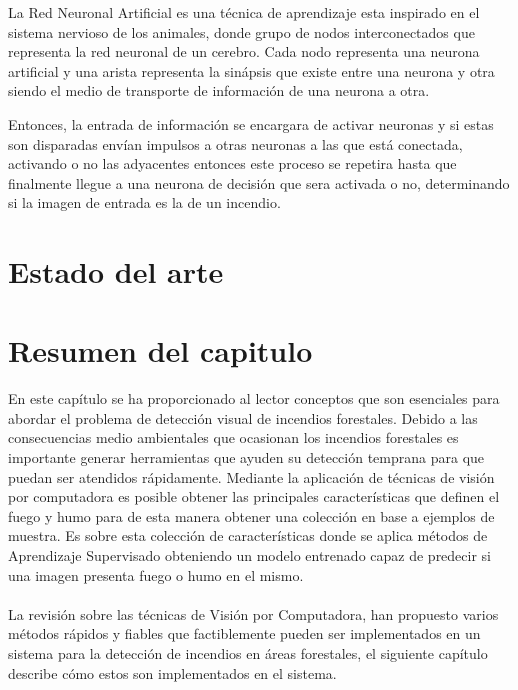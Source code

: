 La Red Neuronal Artificial es una técnica de aprendizaje esta inspirado en el sistema nervioso de los animales, donde grupo de nodos interconectados que representa la red neuronal de un cerebro. Cada nodo representa una neurona artificial y una arista representa la sinápsis que existe entre una neurona y otra siendo el medio de transporte de información de una neurona a otra.

Entonces, la entrada de información se encargara de activar neuronas y si estas son disparadas envían impulsos a otras neuronas a las que está conectada, activando o no las adyacentes entonces este proceso se repetira hasta que finalmente llegue a una neurona de decisión que sera activada o no, determinando si la imagen de entrada es la de un incendio.

\section{Estado del arte}



\section{Resumen del capitulo}

\paragraph{}
En este capítulo se ha proporcionado al lector conceptos que son esenciales para abordar el problema de detección visual de incendios forestales. Debido a las consecuencias medio ambientales que ocasionan los incendios forestales es importante generar herramientas que ayuden su detección temprana para que puedan ser atendidos rápidamente. Mediante la aplicación de técnicas de visión por computadora es posible obtener las principales características que definen el fuego y humo para de esta manera obtener una colección en base a ejemplos de muestra. Es sobre esta colección de características donde se aplica métodos de Aprendizaje Supervisado obteniendo un modelo entrenado capaz de predecir si una imagen presenta fuego o humo en el mismo.

\paragraph{}
La revisión sobre las técnicas de Visión por Computadora, han propuesto varios métodos rápidos y fiables que factiblemente pueden ser implementados en un sistema para la detección de incendios en áreas forestales, el siguiente capítulo describe cómo estos son implementados en el sistema.


